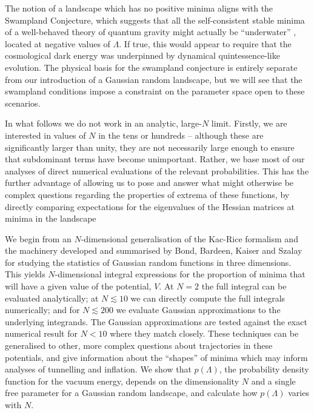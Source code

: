 \documentclass[12pt]{article}
\begin{document}
The notion of a landscape which has no positive minima aligns with the Swampland Conjecture, which suggests that all the self-consistent stable minima of a well-behaved theory of quantum gravity might actually be ``underwater'' \cite{Agrawal2018},  located at negative values of $\Lambda$. If true, this would appear to require that the cosmological dark energy was underpinned by dynamical quintessence-like evolution.  The physical basis for the swampland conjecture is entirely separate from our introduction of a Gaussian random landscape, but we will see that the swampland conditions impose a constraint on the parameter space open to these scenarios.  

In what follows we do not work in an analytic, large-$N$ limit. Firstly, we are interested in values of $N$ in the tens or hundreds -- although these are significantly larger than unity, they are not necessarily large enough to ensure that subdominant terms have become unimportant. Rather, we base most of our analyses of direct numerical evaluations of the relevant probabilities.  This has the further advantage of allowing us to pose and answer what might otherwise be complex questions regarding the properties of extrema of these functions, by directly comparing expectations for the eigenvalues of the Hessian matrices at minima in the landscape  
 
 We begin from an $N$-dimensional generalisation of the Kac-Rice formalism \cite{Kac1943,Rice1945} and the  machinery developed and summarised by Bond, Bardeen, Kaiser and Szalay  \cite{BBKS} for studying the statistics of Gaussian random functions in three dimensions. This yields $N$-dimensional integral expressions for the proportion of minima that will have a given value of the potential, $V$. At $N=2$ the full integral can be evaluated analytically; at $N \lesssim 10$ we can directly compute the full integrals numerically; and for $N \lesssim 200$ we evaluate Gaussian approximations to the underlying integrands. The Gaussian approximations are tested against the exact numerical result for $N <10$ where they match closely. These techniques can be generalised to other, more complex questions about trajectories in these potentials, and give information about the ``shapes'' of minima which may inform analyses of tunnelling and inflation. We show that $p(\Lambda)$, the probability density function for the vacuum energy, depends on the dimensionality $N$ and a single free parameter for a Gaussian random landscape, and calculate how $p(\Lambda)$ varies with $N$. 
 
\end{document}
